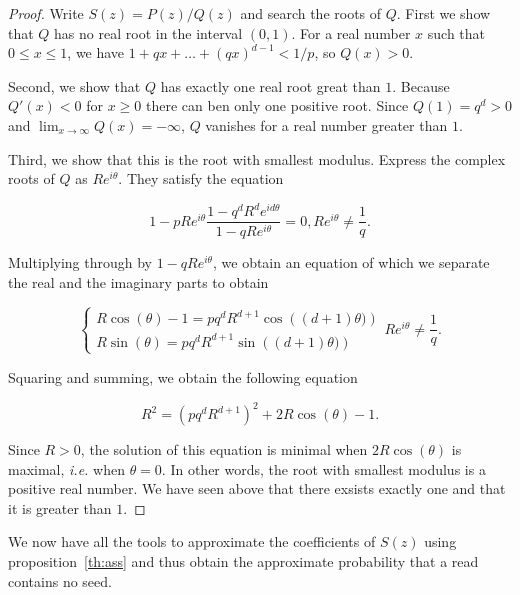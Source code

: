 \documentclass{article}
\begin{document}
\begin{proof}
Write $S(z) = P(z)/Q(z)$ and search the roots of $Q$. First we show that
$Q$ has no real root in the interval $(0,1)$. For a real number $x$ such
that $0\leq x \leq 1$, we have $1+qx+\ldots+(qx)^{d-1} < 1/p$, so $Q(x) >
0$.

Second, we show that $Q$ has exactly one real root great than $1$. Because
$Q'(x) < 0$ for $x \geq 0$ there can ben only one positive root.  Since
$Q(1) = q^d > 0$ and $\lim_{x\rightarrow \infty} Q(x) = -\infty$, $Q$
vanishes for a real number greater than $1$.

Third, we show that this is the root with smallest modulus.  Express the
complex roots of $Q$ as $Re^{i\theta}$. They satisfy the equation

\begin{equation*}
1-pRe^{i\theta}\frac{1-q^dR^de^{id\theta}}{1-qRe^{i\theta}} = 0,
Re^{i\theta} \neq \frac{1}{q}.
\end{equation*}

Multiplying through by $1-qRe^{i\theta}$, we obtain an equation of which
we separate the real and the imaginary parts to obtain

\begin{equation*}
\left\{
\begin{array}{ll}
R \cos (\theta) -1 = pq^dR^{d+1} \cos \left( (d+1) \theta) \right) \\
R \sin (\theta) = pq^dR^{d+1} \sin \left( (d+1) \theta) \right)
\end{array}
\right. Re^{i\theta} \neq \frac{1}{q}.
\end{equation*}

Squaring and summing, we obtain the following equation

\begin{equation*}
R^2 = (pq^dR^{d+1})^2 + 2R \cos(\theta) -1.
\end{equation*}

Since $R > 0$, the solution of this equation is minimal when
$2R\cos(\theta)$ is maximal, \textit{i.e.} when $\theta = 0$. In other
words, the root with smallest modulus is a positive real number. We have
seen above that there exsists exactly one and that it is greater than $1$.
\end{proof}

We now have all the tools to approximate the coefficients of $S(z)$ using
proposition~\ref{th:ass} and thus obtain the approximate probability that
a read contains no seed.
\end{document}
